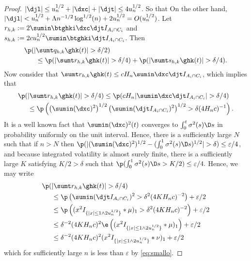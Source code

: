 \begin{proof}
$\vert \djl\vert \le u^{1/2}_n + \vert \dxc \vert + \vert \djt\vert \le 4u^{1/2}_n$. So that  On the other hand, $ \vert \djl \vert < u_n^{1/2} + \Lambda n^{-1/2} \log^{1/2}(n) + 2 u_n^{1/2} = O(u^{1/2}_n)$. Let $r_{h,k} :=  2 \sumin \btghki\dxc \djt I_{A_i \cap C_i}$ and $s_{h,k} := 2 c u_n^{1/2}\sumin \btghki \djt I_{A_i \cap C_i}$. Then 
\begin{align}
 \p(\vert&\sumt q_{h,k} \ghk(t) \vert > \delta/2)\notag \\&  \le\p(\vert\sumt r_{h,k} \ghk(t) \vert > \delta/4) + \p(\vert\sumt s_{h,k} \ghk(t) \vert > \delta/4).\notag
  \label{}
\end{align}
Now consider that $\sumt r_{h,k} \ghk(t) \le  c H_n \sumin \dxc \djt I_{A_i \cap C_i}$, which implies that  
\begin{align}
  \p(&\vert\sumt r_{h,k} \ghk(t) \vert > \delta/4) \le \p(c H_n \vert \sumin \dxc \djt I_{A_i \cap C_i} \vert  > \delta/4)\notag\\& \le \p\left( \left(\sumin (\dxc)^2\right)^{1/2} \left(\sumin ( \djt I_{A_i \cap C_i})^2\right)^{1/2} > \delta (4H_nc)^{-1}\right).\notag
  \label{}
\end{align}
It is a well known fact that  $\sumin (\dxc)^2 (t)$ converges to $\int_0^t\sigma^2(s)\D s$ in probability uniformly on the unit interval. Hence, there is a sufficiently large $N$ such that if $n > N$ then $ \p(\vert (\sumin (\dxc)^2)^{1/2}  - (\int_0^1\sigma^2(s) \D s)^{1/2}\vert > \delta ) \le  \varepsilon/4$, and because integrated volatility is almost surely finite, there is a sufficiently large $K$ satisfying  $K/2 > \delta$ such that $\p( \int_0^1\sigma^2(s) \D s > K/2) \le \varepsilon/4.$ Hence, we may write
\begin{align}
\p(&\vert\sumt r_{h,k} \ghk(t) \vert > \delta/4) \notag \\&\le \p\left(\sumin ( \djt I_{A_i \cap C_i})^2 > \delta^2 (4K H_nc)^{-2}\right) + \varepsilon/2\notag\\&\le  \p\left( (x^2I_{\{\vert x\vert \le 1 \wedge 2 u_n^{1/2}\}}\ast\mu)_1 > \delta^2 (4K H_nc)^{-2}\right) + \varepsilon/2\notag\\
&\le \delta^{-2} (4K H_nc)^{2}\e\left( (x^2I_{\{\vert x\vert \le 1 \wedge 2 u_n^{1/2}\}}\ast\mu)_1  \right) + \varepsilon/2\notag\\
&\le \delta^{-2} (4K H_nc)^{2} (x^2I_{\{\vert x\vert \le 1 \wedge 2 u_n^{1/2}\}}\ast\nu)_1   + \varepsilon/2\notag
  \label{}
\end{align}
which for sufficiently large $n$ is  less than $\varepsilon$ by \eqref{eq:smallo}.


\end{proof}
